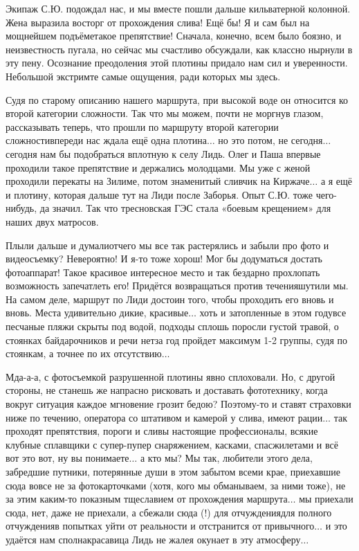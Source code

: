 Экипаж С.Ю. подождал нас, и мы вместе пошли дальше кильватерной колонной. Жена выразила восторг от прохождения слива! Ещё бы! Я и сам был на мощнейшем подъёме\mdash такое препятствие! Сначала, конечно, всем было боязно, и неизвестность пугала, но сейчас мы счастливо обсуждали, как классно нырнули в эту пену. Осознание преодоления этой плотины придало нам сил и уверенности. Небольшой экстрим\mdash те самые ощущения, ради которых мы здесь. 

Судя по старому описанию нашего маршрута, при высокой воде он относится ко второй категории сложности. Так что мы можем, почти не моргнув глазом, рассказывать теперь, что прошли по маршруту второй категории сложности\mdash впереди нас ждала ещё одна плотина$\ldots$ но это потом, не сегодня$\ldots$ сегодня нам бы подобраться вплотную к селу Лидь. Олег и Паша впервые проходили такое препятствие и держались молодцами. Мы уже с женой проходили перекаты на Зилиме, потом знаменитый сливчик на Киржаче$\ldots$ а я ещё и плотину, которая дальше тут на Лиди после Заборья. Опыт С.Ю. тоже чего-нибудь, да значил. Так что тресновская ГЭС стала «боевым крещением» для наших двух матросов.

Плыли дальше и думали\mdash отчего мы все так растерялись и забыли про фото и видеосъемку? Невероятно! И я-то тоже хорош! Мог бы додуматься достать фотоаппарат! Такое красивое интересное место и так бездарно прохлопать возможность запечатлеть его! Придётся возвращаться против течения\mdash шутили мы. На самом деле, маршрут по Лиди достоин того, чтобы проходить его вновь и вновь. Места удивительно дикие, красивые$\ldots$ хоть и затопленные в этом году\mdash все песчаные пляжи скрыты под водой, подходы сплошь поросли густой травой, о стоянках байдарочников и речи нет\mdash за год пройдет максимум 1-2 группы, судя по стоянкам, а точнее по их отсутствию$\ldots$

Мда-а-а, с фотосъемкой разрушенной плотины явно сплоховали. Но, с другой стороны, не станешь же напрасно рисковать и доставать фототехнику, когда вокруг ситуация каждое мгновение грозит бедою? Поэтому-то и ставят страховки ниже по течению, оператора со штативом и камерой у слива, имеют рации$\ldots$ так проходят препятствия, пороги и сливы настоящие профессионалы, всякие клубные сплавщики с супер-пупер снаряжением, касками, спасжилетами и всё вот это вот, ну вы понимаете$\ldots$ а кто мы? Мы так, любители этого дела, забредшие путники, потерянные души в этом забытом всеми крае, приехавшие сюда вовсе не за фотокарточками (хотя, кого мы обманываем, за ними тоже), не за этим каким-то показным тщеславием от прохождения маршрута$\ldots$ мы приехали сюда, нет, даже не приехали, а сбежали сюда (!) для отчуждения\mdash для полного отчуждения\mdash в попытках уйти от реальности и отстранится от привычного$\ldots$ и это удаётся нам сполна\mdash красавица Лидь не жалея окунает в эту атмосферу$\ldots$


